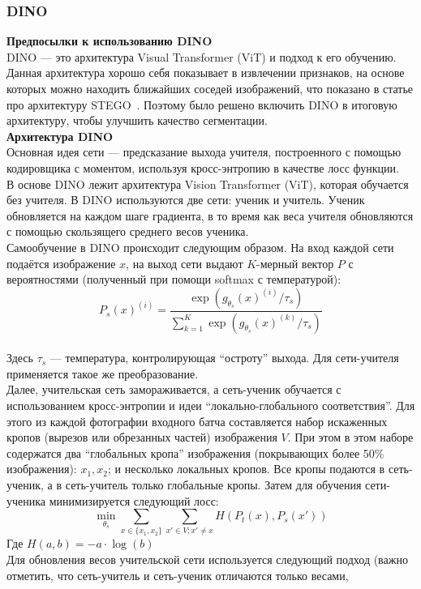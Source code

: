 \subsubsection{DINO}
\noindent\textbf{Предпосылки к использованию DINO} \\
DINO --- это архитектура Visual Transformer (ViT) и подход к его обучению. Данная архитектура хорошо себя показывает в извлечении признаков, на основе которых 
можно находить ближайших соседей изображений, что показано в статье про архитектуру STEGO~\cite{stego}. Поэтому было решено включить DINO в итоговую архитектуру, чтобы
улучшить качество сегментации.
\\
\textbf{Архитектура DINO} \\
Основная идея сети --- предсказание выхода учителя, построенного с помощью кодировщика с моментом, используя кросс-энтропию в качестве лосс функции.
\\
В основе DINO лежит архитектура Vision Transformer (ViT), которая обучается без учителя. В DINO используются две сети: ученик и учитель. 
Ученик обновляется на каждом шаге градиента, в то время как веса учителя обновляются с помощью скользящего среднего весов ученика.
\\
Самообучение в DINO происходит следующим образом.
На вход каждой сети подаётся изображение $x$, на выход сети выдают $K$-мерный вектор $P$ с вероятностями (полученный при помощи softmax с температурой):
\[P_s{(x)}^{(i)} = \frac{\exp(g_{\theta_s}{(x)}^{(i)} / \tau_s)}{\sum\limits_{k=1}^K\exp(g_{\theta_s}{(x)}^{(k)} / \tau_s)}\]
\\
Здесь $\tau_s$ --- температура, контролирующая ``остроту'' выхода. Для сети-учителя применяется такое же преобразование.
\\
Далее, учительская сеть замораживается, а сеть-ученик обучается с использованием кросс-энтропии и идеи ``локально-глобального соответствия''. Для этого 
из каждой фотографии входного батча составляется набор искаженных кропов (вырезов или обрезанных частей) изображения $V$. 
При этом в этом наборе содержатся два ``глобальных кропа'' изображения (покрывающих более 50\% изображения): $x_1, x_2$; и несколько локальных кропов. 
Все кропы подаются в сеть-ученик, а в сеть-учитель только глобальные кропы. Затем для обучения сети-ученика минимизируется следующий лосс:
\[\overset{}{\underset{\theta_s}{\min}} \sum\limits_{x\in\{x_1,x_2\}} \sum\limits_{x'\in V; x' \neq x}H(P_t(x), P_s(x'))\]
Где $H(a,b) = -a\cdot\log(b)$
\\
Для обновления весов учительской сети используется следующий подход (важно отметить, что сеть-учитель и сеть-ученик отличаются только весами, 
